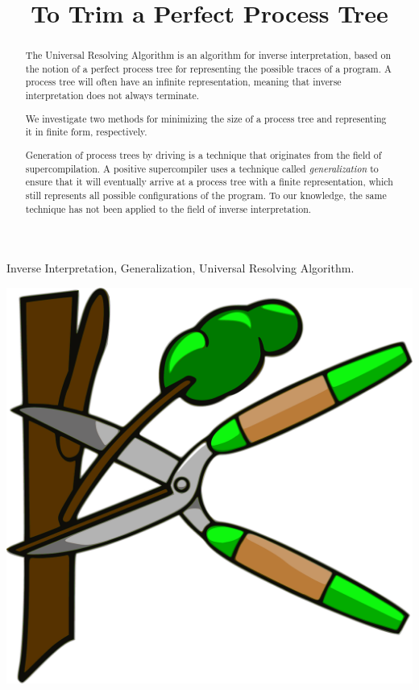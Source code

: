 \documentclass[10pt]{../sigplanconf}
\title{To Trim a Perfect Process Tree}
\begin{document}
\maketitle

\begin{abstract}
  The Universal Resolving Algorithm\cite{abramov2000universal} is an
  algorithm for inverse interpretation, based on the notion of a
  perfect process tree for representing the possible traces of a
  program. A process tree will often have an infinite representation,
  meaning that inverse interpretation does not always terminate.

  We investigate two methods for minimizing the size of a process tree
  and representing it in finite form, respectively.

  Generation of process trees by driving is a technique that
  originates from the field of
  supercompilation\cite{sorensen1998introduction}. A positive
  supercompiler uses a technique called \emph{generalization} to
  ensure that it will eventually arrive at a process tree with a
  finite representation, which still represents all possible
  configurations of the program. To our knowledge, the same technique
  has not been applied to the field of inverse interpretation.
\end{abstract}

\keywords Inverse Interpretation, Generalization, Universal Resolving
Algorithm.
\begin{center}
  \vspace{0.5cm}
  \includegraphics[width=0.6\columnwidth]{../figures/pruning.pdf}
  \vspace{0.5cm}
\end{center}

\newpage
\end{document}
